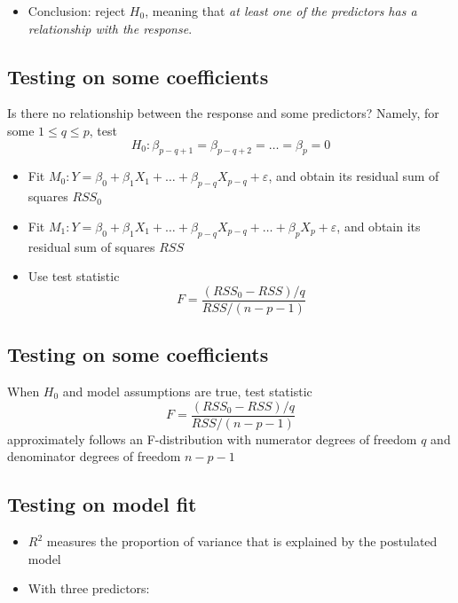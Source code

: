 \documentclass[]{article}
\providecommand{\tightlist}{%
  \setlength{\itemsep}{0pt}\setlength{\parskip}{0pt}}
\begin{document}
\begin{itemize}
\tightlist
\item
  Conclusion: reject \(H_0\), meaning that \emph{at least one of the
  predictors has a relationship with the response}.
\end{itemize}

\subsection{Testing on some
coefficients}\label{testing-on-some-coefficients}

Is there no relationship between the response and some predictors?
Namely, for some \(1 \le q \le p\), test
\[H_0: \beta_{p-q+1}=\beta_{p-q+2}= \ldots = \beta_{p}=0\]

\begin{itemize}
\tightlist
\item
  Fit
  \(M_0: Y = \beta_0 + \beta_1 X_1 + \ldots + \beta_{p-q} X_{p-q} + \varepsilon\),
  and obtain its residual sum of squares \(RSS_0\)
\item
  Fit
  \(M_1: Y = \beta_0 + \beta_1 X_1 + \ldots + \beta_{p-q} X_{p-q} + \ldots + \beta_p X_p+\varepsilon\),
  and obtain its residual sum of squares \(RSS\)
\item
  Use test statistic \[F = \frac{(RSS_0 - RSS)/q}{RSS/(n-p-1)}\]
\end{itemize}

\subsection{Testing on some
coefficients}\label{testing-on-some-coefficients-1}

When \(H_0\) and model assumptions are true, test statistic
\[F = \frac{(RSS_0 - RSS)/q}{RSS/(n-p-1)}\] approximately follows an
F-distribution with numerator degrees of freedom \(q\) and denominator
degrees of freedom \(n-p-1\)

\subsection{Testing on model fit}\label{testing-on-model-fit}

\begin{itemize}
\tightlist
\item
  \(R^2\) measures the proportion of variance that is explained by the
  postulated model
\item
  With three predictors:
\end{itemize}
\end{document}
